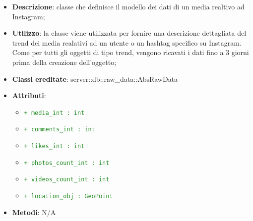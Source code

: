 			\begin{itemize}
				\item \textbf{Descrizione}: classe che definisce il modello dei dati di un media realtivo ad Instagram;
				\item \textbf{Utilizzo}: la classe viene utilizzata per fornire una descrizione dettagliata del trend dei media realativi ad un utente o un hashtag specifico su Instagram. Come per tutti gli oggetti di tipo trend, vengono ricavati i dati fino a 3 giorni prima della creazione dell'oggetto;
				\item \textbf{Classi ereditate}: server::db::raw\_data::AbsRawData
				\item \textbf{Attributi}:
					\begin{itemize}
						\item \textcolor{forestgreen}{\texttt{+ media\_int : int}}
						\item \textcolor{forestgreen}{\texttt{+ comments\_int : int}}
						\item \textcolor{forestgreen}{\texttt{+ likes\_int : int}}
						\item \textcolor{forestgreen}{\texttt{+ photos\_count\_int : int}}
						\item \textcolor{forestgreen}{\texttt{+ videos\_count\_int : int}}
						\item \textcolor{forestgreen}{\texttt{+ location\_obj : GeoPoint}}
					\end{itemize}
				\item \textbf{Metodi}: N/A
			\end{itemize}

